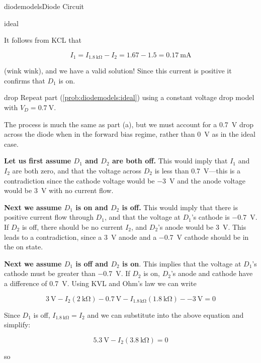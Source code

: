 \begin{mainquestion}{diodemodels}{Diode Circuit}
\begin{partquestion}{ideal}
\begin{answer}
It follows from KCL that

\[
I_1
=
I_{\qty{1.8}{\kilo\ohm}}-I_2
=
1.67-1.5
=
\qty{0.17}{\milli\ampere}
\]

(wink wink), and we have a valid solution! Since this current is positive it confirms that $D_1$ is on.
\end{answer}
\end{partquestion}

\begin{partquestion}{drop}
{Repeat part (\cref{prob:diodemodels:ideal}) using a constant voltage drop model with $V_D = \qty{0.7}{\volt}$.}

\begin{answer}
The process is much the same as part (a), but we must account for a \qty{0.7}{\volt} drop across the diode when in the forward bias regime, rather than \qty{0}{\volt} as in the ideal case.

\textbf{Let us first assume $D_1$ and $D_2$ are both off.} This would imply that $I_1$ and $I_2$ are both zero, and that the voltage across $D_2$ is less than \qty{0.7}{\volt}—this is a contradiction since the cathode voltage would be \qty{-3}{\volt} and the anode voltage would be \qty{3}{\volt} with no current flow.

\textbf{Next we assume $D_1$ is on and $D_2$ is off.} This would imply that there is positive current flow through $D_1$, and that the voltage at $D_1$'s cathode is \qty{-0.7}{\volt}. If $D_2$ is off, there should be no current $I_2$, and $D_2$'s anode would be \qty{3}{\volt}. This leads to a contradiction, since a \qty{3}{\volt} anode and a \qty{-0.7}{\volt} cathode should be in the on state.

\textbf{Next we assume $D_1$ is off and $D_2$ is on}. This implies that the voltage at $D_1$'s cathode must be greater than \qty{-0.7}{\volt}. If $D_2$ is on, $D_2$'s anode and cathode have a difference of \qty{0.7}{\volt}. Using KVL and Ohm's law we can write

\[
\qty{3}{\volt}
-
I_2\left(\qty{2}{\kilo\ohm}\right)
-
\qty{0.7}{\volt}
-
I_{1.8\,\mathrm{k\Omega}}\left(\qty{1.8}{\kilo\ohm}\right)
-
\qty{-3}{\volt}
=
0
\]

Since $D_1$ is off, $I_{\qty{1.8}{\kilo\ohm}} = I_2$ and we can substitute into the above equation and simplify:

\[
\qty{5.3}{\volt}
-
I_2\left(\qty{3.8}{\kilo\ohm}\right)
=
0
\]

so


\end{answer}
\end{partquestion}
\end{mainquestion}
